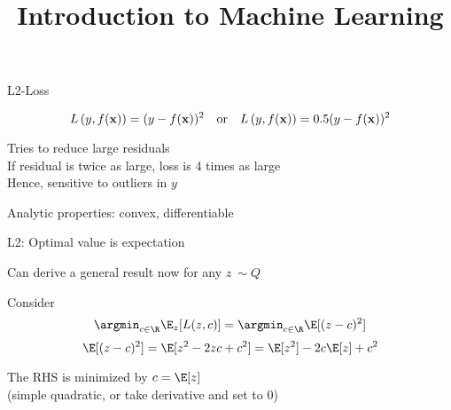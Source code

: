 \documentclass[11pt,compress,t,notes=noshow, xcolor=table]{beamer}
\title{Introduction to Machine Learning}
\begin{document}
    

\begin{framei}{L2-Loss}

\item $$
L\left(y, f(\mathbf{x})\right) = (y-f(\mathbf{x}))^2 \quad \text{or} \quad L\left(y, f(\mathbf{x})\right) = 0.5 (y-f(\mathbf{x}))^2
$$

\item Tries to reduce large residuals \\
If residual is twice as large, loss is 4 times as large\\
Hence, sensitive to outliers in $y$
\item Analytic properties: convex, differentiable 



\vfill
{}

\end{framei}


\begin{framei}[sep=L]{L2: Optimal value is expectation}

\item Can derive a general result now for any $z ~ \sim Q$
\item Consider 
$$ 
\argmin_{c \in \R}  \E_{z} [L(z, c)] = \argmin_{c \in \R}  \E [(z - c)^2] 
$$
$$
\E [(z - c)^2] =  \E [z^2 - 2zc + c^2 ] = \E[z^2] -2c\E[z] + c^2   
$$

\item The RHS is minimized by $c = \E[z]$\\
(simple quadratic, or take derivative and set to 0)

\end{framei}
\end{document}
